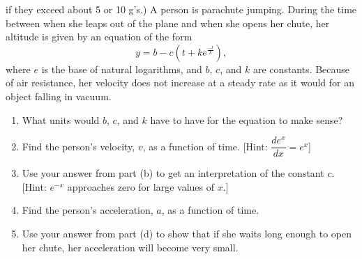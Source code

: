 \documentclass[12pt,addpoints]{exam}
\begin{document}
\begin{center}
\begin{questions}
			if they exceed about 5 or 10 g’s.)\vspace{1in}
			\question A person is parachute jumping. During the time between when she leaps out of the plane and when she opens her chute, her altitude is given by an equation of the form
			$$y=b-c(t+ke^{\frac{-t}{k}}),$$
			where $e$ is the base of natural logarithms, and $b$, $c$, and $k$ are constants. Because of air resistance, her velocity does not increase at a steady rate as it would for an object falling in vacuum.
			\begin{enumerate}[label=(\alph*)]
				\item What units would $b$, $c$, and $k$ have to have for the equation to make sense?\vspace{1in}
				\item Find the person’s velocity, $v$, as a function of time. [Hint: $\dfrac{d e^x}{dx}=e^x$]\vspace{1in}
				\item Use your answer from part (b) to get an interpretation of the constant $c$. [Hint: $e^{-x}$ approaches zero for large values of $x$.]\vspace{1in}
				\item Find the person’s acceleration, $a$, as a function of time.\vspace{1in}
				\item Use your answer from part (d) to show that if she waits long enough to open her chute, her acceleration will become very small.\vspace{1in} 
			\end{enumerate}
		\end{questions}
		

	\end{center}		
\end{document}
